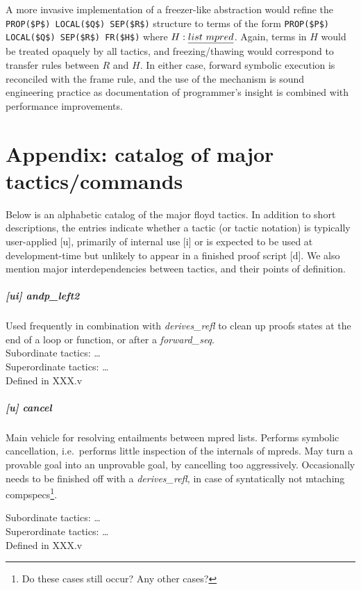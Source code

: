 \documentclass[12pt,fleqn,openany,oneside,showtrims]{memoir}
\begin{document}
A more invasive implementation of a freezer-like abstraction would
refine the \lstinline{PROP($P$) LOCAL($Q$) SEP($R$)} structure to
terms of the form \lstinline{PROP($P$) LOCAL($Q$) SEP($R$) FR($H$)}
where $H: \emph{list\ mpred}$. Again, terms in $H$ would be treated
opaquely by all tactics, and freezing/thawing would correspond to
transfer rules between $R$ and $H$. In either case, forward symbolic
execution is reconciled with the frame rule, and the use of the
mechanism is sound engineering practice as documentation of
programmer's insight is combined with performance improvements.

\chapter{Appendix: catalog of major tactics/commands}
Below is an alphabetic catalog of the major floyd tactics. In addition
to short descriptions, the entries indicate whether a tactic (or
tactic notation) is typically user-applied [u], primarily of
internal use [i] or is expected to be used at development-time
but unlikely to appear in a finished proof script [d]. We also
mention major interdependencies between tactics, and their points of
definition.

\paragraph{[ui] andp\_left2}

Used frequently in combination with \emph{derives\_refl} to clean up
proofs states at the end of a loop or function, or after a \emph{forward\_seq}.\\
Subordinate tactics: \ldots\\
Superordinate tactics: \ldots\\
Defined in XXX.v

\paragraph{[u] cancel}
Main vehicle for resolving entailments between mpred lists.  Performs
symbolic cancellation, i.e.~performs little inspection of the
internals of mpreds. May turn a provable goal into an unprovable goal,
by cancelling too aggressively. Occasionally needs to be finished off
with a \emph{derives\_refl}, in case of syntatically not mtaching
compspecs\footnote{Do these cases still occur? Any other cases?}.

Subordinate tactics: \ldots\\
Superordinate tactics: \ldots\\
Defined in XXX.v
\end{document}
